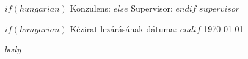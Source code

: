 \begin{titlepage}
\begin{center}
\end{center}

\vspace*{3cm}
\begin{center}
    
    {\fontsize{16}{22}\selectfont 
    $if(hungarian)$
    Konzulens: 
    $else$
    Supervisor:
    $endif$
    $supervisor$}
\end{center}


\begin{center}
    \vspace*{\fill}
    {\fontsize{14}{20}\selectfont 
    $if(hungarian)$
    Kézirat lezárásának dátuma:
    $endif$
    \today}
\end{center}
\end{titlepage}

\newpage




\renewcommand{\abstractname}{\Large Abstract}

\begin{abstract}

{\fontsize{16}{22}\selectfont 
    $abstract$}

\end{abstract}




\newpage
\setcounter{page}{1}
{
  \hypersetup{linkcolor=black}
  \tableofcontents
}

\newpage

{
  \hypersetup{linkcolor=black}
  \listoffigures
}

{
  \hypersetup{linkcolor=black}
  \listoftables
}

\newpage

$body$

\printbibliography

